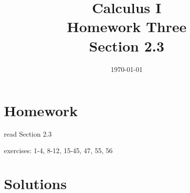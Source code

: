 \documentclass[letterpaper]{exam}
\title{Calculus I \\ Homework Three \\ Section 2.3}
\author{}
\date{\today}
\begin{document}
  \maketitle

  \section{Homework}
    \begin{itemize*}
      \item read Section 2.3
      \item exercises: 1-4, 8-12, 15-45, 47, 55, 56
    \end{itemize*}

  \ifprintanswers

    \section{Solutions}
\end{document}
